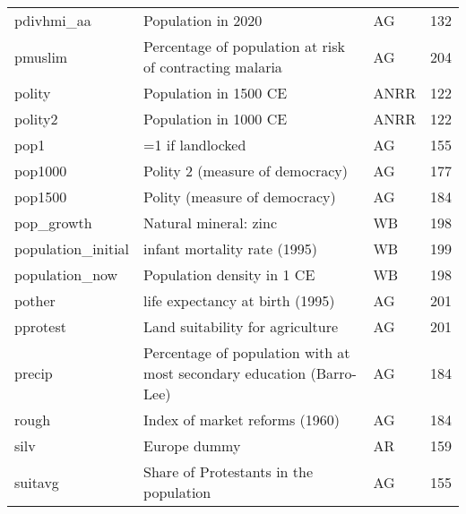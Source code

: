 \begin{tabular}{lllr}
pdivhmi\_aa                     &                                                        Population in 2020 &     AG &   132 \\
pmuslim                        &                   Percentage of population at risk of contracting malaria &     AG &   204 \\
polity                         &                                                     Population in 1500 CE &   ANRR &   122 \\
polity2                        &                                                     Population in 1000 CE &   ANRR &   122 \\
pop1                           &                                                          =1 if landlocked &     AG &   155 \\
pop1000                        &                                           Polity 2 (measure of democracy) &     AG &   177 \\
pop1500                        &                                             Polity (measure of democracy) &     AG &   184 \\
pop\_growth                     &                                                     Natural mineral: zinc &     WB &   198 \\
population\_initial             &                                              infant mortality rate (1995) &     WB &   199 \\
population\_now                 &                                                Population density in 1 CE &     WB &   198 \\
pother                         &                                           life expectancy at birth (1995) &     AG &   201 \\
pprotest                       &                                          Land suitability for agriculture &     AG &   201 \\
precip                         &     Percentage of population with at most secondary education (Barro-Lee) &     AG &   184 \\
rough                          &                                            Index of market reforms (1960) &     AG &   184 \\
silv                           &                                                              Europe dummy &     AR &   159 \\
suitavg                        &                                    Share of Protestants in the population &     AG &   155 \\

\end{tabular}
